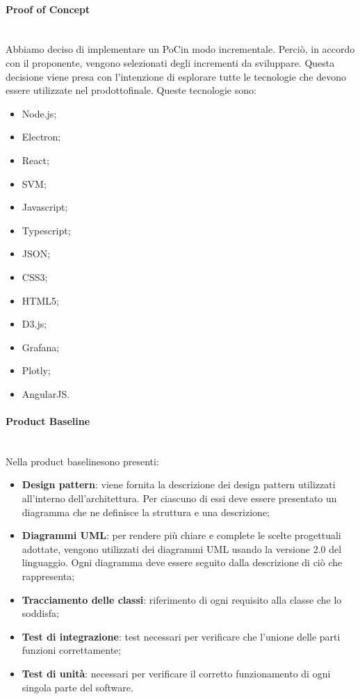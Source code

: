 			\paragraph*{Proof of Concept}\mbox{}\\ [1mm]
			Abbiamo deciso di implementare un PoC\glosp in modo incrementale. Perciò, in accordo con il proponente, vengono selezionati degli incrementi da sviluppare. Questa decisione viene presa con l'intenzione di esplorare tutte le tecnologie che devono essere utilizzate nel prodotto\glosp finale. Queste tecnologie sono:
			\begin{itemize}
				\item Node.js;
				\item Electron;
				\item React;
				\item SVM;
				\item Javascript;
				\item Typescript;
				\item JSON;
				\item CSS3;
				\item HTML5;
				\item D3.js;
				\item Grafana;
				\item Plotly;
				\item AngularJS.
			\end{itemize}
			\paragraph*{Product Baseline}\mbox{}\\ [1mm]
			Nella product baseline\glosp sono presenti:
			\begin{itemize}
				\item \textbf{Design pattern}: viene fornita la descrizione dei design pattern utilizzati all'interno dell'architettura. Per ciascuno di essi deve essere presentato un diagramma che ne definisce la struttura e una descrizione;
				\item \textbf{Diagrammi UML}: per rendere più chiare e complete le scelte progettuali adottate, vengono utilizzati dei diagrammi UML usando la versione 2.0 del linguaggio. Ogni diagramma deve essere seguito dalla descrizione di ciò che rappresenta;
				\item \textbf{Tracciamento delle classi}: riferimento di ogni requisito alla classe che lo soddisfa;
				\item \textbf{Test di integrazione}: test necessari per verificare che l'unione delle parti funzioni correttamente;
				\item \textbf{Test di unità}: necessari per verificare il corretto funzionamento di ogni singola parte del software.
			\end{itemize}

